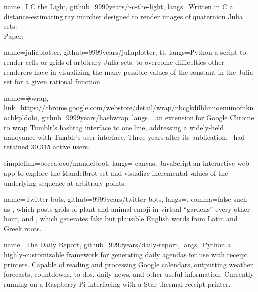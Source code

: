 \documentclass{article}
\begin{document}
\begin{softwarelist}

\begin{software}{name=I C the Light, github=9999years/i-c-the-light,
		langs=Written in C}
	a distance-estimating ray marcher designed to render images of
	quaternion Julia sets. \\
	Paper: 
\end{software}

\begin{software}{name=juliaplotter, github=9999years/juliaplotter, tt,
		langs=Python}
	a script to render cells or grids of arbitrary Julia sets, to
	overcome difficulties other renderers have in visualizing the many
	possible values of the constant  in the Julia set for a given
	rational function.
\end{software}

\newcommand{\hashwrap}{\link{https://chrome.google.com/webstore/detail/wrap/nbcgkdilbhnnoemimofnknocbkpldobi}{\#wrap}}
\begin{software}{name=\#wrap,
		link=https://chrome.google.com/webstore/detail/wrap/nbcgkdilbhnnoemimofnknocbkpldobi,
		github=9999years/hashwrap,
		langs=\css}
	an extension for Google Chrome to wrap Tumblr's hashtag interface to
	one line, addressing a widely-held annoyance with Tumblr's user
	interface. Three years after its publication, \namedlink\ had
	retained 30,315 active users.
\end{software}


\begin{software}{simplelink=becca.ooo/mandelbrot,
		langs={ canvas, JavaScript}}
	an interactive web app to explore the Mandelbrot set and visualize
	incremental values of the underlying sequence at arbitrary points.
\end{software}

\begin{software}{name=Twitter bots, github=9999years/twitter-bots,
		langs=\php, comma=false}
	such as , which posts grids of plant and animal
	emoji in virtual ``gardens'' every other hour, and
	, which generates fake but plausible English
	words from Latin and Greek roots.
\end{software}

\begin{software}{name=The Daily Report, github=9999years/daily-report,
		langs=Python}
	a highly-customizable framework for generating daily agendas for use
	with receipt printers. Capable of reading and processing Google
	calendars, outputting weather forecasts, countdowns, to-dos, daily
	news, and other useful information. Currently running on a Raspberry
	Pi interfacing with a Star thermal receipt printer.
\end{software}


\end{softwarelist}
\end{document}
